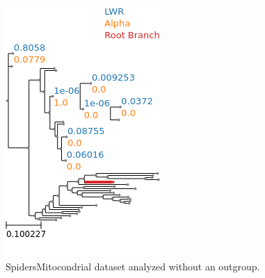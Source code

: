 \documentclass{article}
\begin{document}
\begin{figure}
  \begin{center}
    \includegraphics[width=.75\linewidth]{./figs/spiders/mito_no_outgroup.png}
    \caption{SpidersMitocondrial dataset analyzed without an outgroup.}
    \label{fig:spiders-mito-no-outgroup}
  \end{center}
\end{figure}


%
\end{document}
